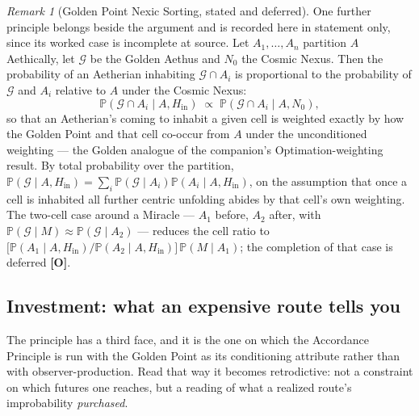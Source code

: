 \documentclass[11pt]{article}
\numberwithin{equation}{section}
\theoremstyle{plain}
\theoremstyle{definition}
\theoremstyle{remark}
\newtheorem{remark}[theorem]{Remark}
\newcommand{\PP}{\mathbb{P}}
\begin{document}
\begin{remark}[Golden Point Nexic Sorting, stated and deferred]
\label{ra:rem:sorting}
One further principle belongs beside the argument and is recorded here in
statement only, since its worked case is incomplete at source. Let
$A_1,\dots,A_n$ partition $A$ Aethically, let $\mathcal G$ be the Golden
Aethus and $N_0$ the Cosmic Nexus. Then the probability of an Aetherian
inhabiting $\mathcal G\cap A_i$ is proportional to the probability of
$\mathcal G$ and $A_i$ relative to $A$ under the Cosmic Nexus:
\begin{equation}\label{ra:eq:sorting}
\PP(\mathcal G\cap A_i\mid A,H_{\mathrm{in}})\;\propto\;
\PP(\mathcal G\cap A_i\mid A,N_0),
\end{equation}
so that an Aetherian's coming to inhabit a given cell is weighted
exactly by how the Golden Point and that cell co-occur from $A$ under
the unconditioned weighting --- the Golden analogue of the companion's
Optimation-weighting result. By total probability over the partition,
$\PP(\mathcal G\mid A,H_{\mathrm{in}})=\sum_i\PP(\mathcal G\mid A_i)
\PP(A_i\mid A,H_{\mathrm{in}})$, on the assumption that once a cell is
inhabited all further centric unfolding abides by that cell's own
weighting. The two-cell case around a Miracle --- $A_1$ before, $A_2$
after, with $\PP(\mathcal G\mid M)\approx\PP(\mathcal G\mid A_2)$ ---
reduces the cell ratio to
$\bigl[\PP(A_1\mid A,H_{\mathrm{in}})/\PP(A_2\mid A,H_{\mathrm{in}})\bigr]
\,\PP(M\mid A_1)$; the completion of that case is deferred
\textbf{[O]}.
\end{remark}

\subsection{Investment: what an expensive route tells you}
\label{ra:sub:investment}

The principle has a third face, and it is the one on which the Accordance
Principle is run with the Golden Point as its conditioning attribute
rather than with observer-production. Read that way it becomes
retrodictive: not a constraint on which futures one reaches, but a
reading of what a realized route's improbability \emph{purchased}.
\end{document}
